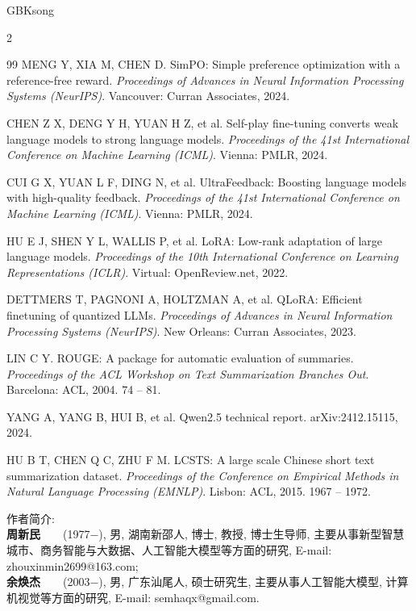 \begin{CJK*}{GBK}{song}
\begin{multicols}{2}
{\begin{thebibliography}{99}
 MENG Y, XIA M, CHEN D. SimPO: Simple preference optimization with a reference-free reward. {\it Proceedings of Advances in Neural Information Processing Systems (NeurIPS)}. Vancouver: Curran Associates, 2024.

 CHEN Z X, DENG Y H, YUAN H Z, et al. Self-play fine-tuning converts weak language models to strong language models. {\it Proceedings of the 41st International Conference on Machine Learning (ICML)}. Vienna: PMLR, 2024.

 CUI G X, YUAN L F, DING N, et al. UltraFeedback: Boosting language models with high-quality feedback. {\it Proceedings of the 41st International Conference on Machine Learning (ICML)}. Vienna: PMLR, 2024.

 HU E J, SHEN Y L, WALLIS P, et al. LoRA: Low-rank adaptation of large language models. {\it Proceedings of the 10th International Conference on Learning Representations (ICLR)}. Virtual: OpenReview.net, 2022.

 DETTMERS T, PAGNONI A, HOLTZMAN A, et al. QLoRA: Efficient finetuning of quantized LLMs. {\it Proceedings of Advances in Neural Information Processing Systems (NeurIPS)}. New Orleans: Curran Associates, 2023.

 LIN C Y. ROUGE: A package for automatic evaluation of summaries. {\it Proceedings of the ACL Workshop on Text Summarization Branches Out}. Barcelona: ACL, 2004. 74 -- 81.

 YANG A, YANG B, HUI B, et al. Qwen2.5 technical report. arXiv:2412.15115, 2024.

 HU B T, CHEN Q C, ZHU F M. LCSTS: A large scale Chinese short text summarization dataset. {\it Proceedings of the Conference on Empirical Methods in Natural Language Processing (EMNLP)}. Lisbon: ACL, 2015. 1967 -- 1972.

\end{thebibliography}}

\vskip 7pt
\noindent
{ 作者简介:}\\
 {\scriptsize
\indent
\textbf{周新民}~~~~(1977$-$), 男, 湖南新邵人, 博士, 教授, 博士生导师, 主要从事新型智慧城市、商务智能与大数据、人工智能大模型等方面的研究, E-mail: zhouxinmin2699@163.com;\\
\indent \textbf{余焕杰}~~~~(2003$-$), 男, 广东汕尾人, 硕士研究生, 主要从事人工智能大模型, 计算机视觉等方面的研究, E-mail: semhaqx@gmail.com.}

\end{multicols}
\clearpage
\end{CJK*}
